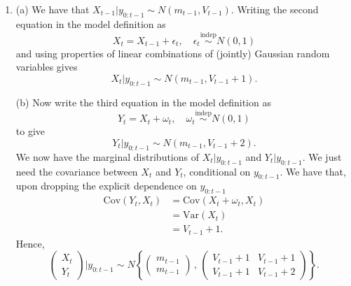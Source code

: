 \documentclass[12pt,BCOR2mm,DIV14,english]{scrreprt}
\theoremstyle{exmp}
\newcommand{\V}{\mathrm{Var}}
\begin{document}
\begin{enumerate}
(b) Note that $X_t$ is discrete, taking values in the set $\{x_{t-1},1-x_{t-1}\}$. Hence 
$p(x_t|x_{t-1},y_t)$ is the corresponding probability mass function. We have that
\[
p(x_t|x_{t-1},y_t)\propto p(x_t|x_{t-1})p(y_t|x_t).
\]
Now suppose $x_{t-1}=x$. Then,
\[
p(X_t=x|x_{t-1},y_t)\propto (1-\epsilon)N(y_t;x,1).
\]
Similarly,
\[
p(X_t=1-x|x_{t-1},y_t)\propto \epsilon N(y_t;1-x,1).
\]
The normalising constant in both probabilities is simply the sum of the two 
expressions above.

(c) We have $x_{t-1}=0$. We require 
\begin{align*}
p(X_t=1-x_{t-1}|x_{t-1},y_t) &= p(X_t=x_{t-1}|x_{t-1},y_t) \\
\Rightarrow \epsilon\exp\left(-\frac{1}{2}(y_t-1)^2\right) &= (1-\epsilon)\exp\left(-\frac{1}{2}y_t^2 \right)\\
\Rightarrow y_t &= \frac{1}{2}-\log\left(\frac{\epsilon}{1-\epsilon}  \right).
\end{align*}


\item 

(a) We have that $X_{t-1}|y_{0:t-1}\sim N(m_{t-1}, V_{t-1})$. Writing the second equation 
in the model definition as
\[
X_t=X_{t-1}+\epsilon_t, \quad \epsilon_t\overset{\textrm{indep}}{\sim} N(0,1)
\]
and using properties of linear combinations of (jointly) Gaussian random variables gives
\[
X_t|y_{0:t-1}\sim N(m_{t-1},V_{t-1}+1).
\]

(b) Now write the third equation in the model definition as
\[
Y_t=X_t+\omega_t,\quad \omega_t\overset{\textrm{indep}}{\sim} N(0,1)
\]
to give
\[
Y_t|y_{0:t-1}\sim N(m_{t-1},V_{t-1}+2).
\]
We now have the marginal distributions of $X_t|y_{0:t-1}$ and $Y_t|y_{0:t-1}$. We just need 
the covariance between $X_t$ and $Y_t$, conditional on $y_{0:t-1}$. We have that, upon 
dropping the explicit dependence on $y_{0:t-1}$ 
\begin{align*}
\textrm{Cov}(Y_t,X_t)&= \textrm{Cov}(X_t+\omega_t,X_t)\\
&=\V(X_t)\\
&=V_{t-1}+1.
\end{align*}
Hence,
\[
\begin{pmatrix}X_t \\Y_t \end{pmatrix}\big | y_{0:t-1} \sim 
N\left\{ \begin{pmatrix} m_{t-1} \\ m_{t-1} \end{pmatrix}\,,\, 
\begin{pmatrix} V_{t-1}+1 & V_{t-1}+1 \\
V_{t-1}+1 & V_{t-1}+2 \end{pmatrix} \right\}.
\] 


\end{enumerate}
\end{document}
